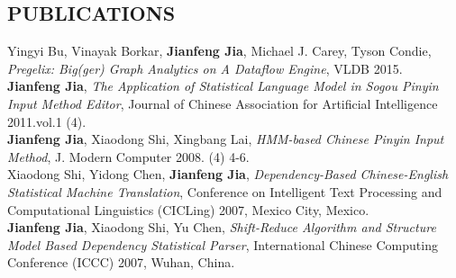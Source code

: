 \documentclass{res}
\begin{document}
\begin{resume}
\section{PUBLICATIONS}
     Yingyi Bu, Vinayak Borkar, \textbf{Jianfeng Jia}, Michael J. Carey, Tyson Condie, \emph{Pregelix: Big(ger) Graph Analytics on A Dataflow Engine}, VLDB 2015.\\
     \textbf{Jianfeng Jia}, \emph{The Application of Statistical Language Model in Sogou Pinyin Input Method Editor}, Journal of Chinese Association for Artificial Intelligence 2011.vol.1 (4).\\
     \textbf{Jianfeng Jia}, Xiaodong Shi, Xingbang Lai, \emph{HMM-based Chinese Pinyin Input Method}, J. Modern Computer 2008. (4) 4-6.\\
     Xiaodong Shi, Yidong Chen, \textbf{Jianfeng Jia}, \emph{Dependency-Based Chinese-English Statistical Machine Translation}, Conference on Intelligent Text Processing and Computational Linguistics (CICLing) 2007, Mexico City, Mexico.\\
     \textbf{Jianfeng Jia}, Xiaodong Shi, Yu Chen, \emph{Shift-Reduce Algorithm and Structure Model Based Dependency Statistical Parser}, International Chinese Computing Conference (ICCC) 2007, Wuhan, China.

\end{resume}
\end{document}
